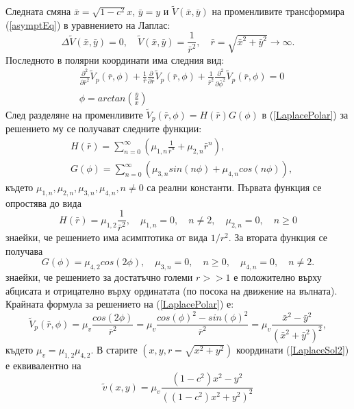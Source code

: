 \documentclass{article}
\newcommand{\be}{\begin{equation}}
\newcommand{\ee}{\end{equation}}
\newcommand{\rf}[1]{(\ref{#1})}
\begin{document}
\FloatBarrier
Следната смяна $\bar x  = \sqrt{1-c^2} x$, $\bar y = y$ и $\tilde V (\bar x, \bar y)$ на променливите трансформира \rf{asymptEq} в уравнението на Лаплас:
\be\label{LaplaceEq}
\Delta \tilde V(\bar x, \bar y) = 0, \quad \tilde V(\bar x, \bar y) = \frac{1}{\bar r^2}, \quad \bar r = \sqrt{\bar x^2 + \bar y^2} \rightarrow \infty.
\ee
Последното в полярни координати има следния вид:
\begin{align}\label{LaplacePolar}
&\frac{\partial^2}{\partial \bar r^2} \tilde V_p(\bar r, \phi) + \frac{1}{\bar r} \frac{\partial}{\partial \bar r} \tilde V_p(\bar r, \phi) + \frac{1}{\bar r^2} \frac{\partial^2}{\partial \bar \phi^2} \tilde V_p(\bar r, \phi) = 0 \\
&\phi = arctan(\frac{\bar y}{\bar x}) \nonumber
\end{align}
След разделяне на променливите $\tilde V_p(\bar r, \phi) = H(\bar r) G(\phi)$ в \rf{LaplacePolar} за решението му се получават следните функции:
\begin{align}\label{LaplaceSol}
&H(\bar{r}) = \sum^{\infty}_{n=0} (\mu_{1,n} \frac{1}{ \bar{r}^n} + \mu_{2,n} \bar{r}^n ),
\\ \nonumber &G(\phi) = \sum^{\infty}_{n=0} (\mu_{3,n}sin(n \phi ) + \mu_{4,n}cos(n \phi)),
\end{align}
където $\mu_{1,n}, \mu_{2,n}, \mu_{3,n}, \mu_{4,n}, n \neq 0$ са реални константи. Първата функция се опростява до вида
\be
H(\bar r) = \mu_{1,2}\frac{1}{\bar r^2}, \quad \mu_{1,n} = 0, \quad n \neq 2, \quad \mu_{2,n} = 0, \quad n \ge 0
\ee
знаейки, че решението има асимптотика от вида $1/r^2$. За втората функция се получава
\be
G(\phi) = \mu_{4,2}cos(2 \phi), \quad \mu_{3,n} = 0, \quad n \ge 0, \quad \mu_{4,n} = 0, \quad n \neq 2.
\ee
знаейки, че решението за достатъчно големи $r >> 1$ е положително върху абцисата и отрицателно върху ординатата (по посока на движение на вълната). Крайната формула за решението на \rf{LaplacePolar} е:
\be \label{LaplaceSol2}
\tilde V_p(\bar r, \phi) = \mu_v \frac{ cos(2 \phi) }{ \bar r^2 } = \mu_v \frac{ cos(\phi)^2 - sin(\phi)^2 }{ \bar r^2 } = \mu_v \frac{ \bar x^2 - \bar y^2 }{ (\bar x^2 + \bar y^2)^2 },
\ee
където $\mu_v = \mu_{1,2} \mu_{4,2}$. В старите $(x, y, r=\sqrt{x^2+y^2})$ координати \rf{LaplaceSol2} е еквивалентно на 
\be\label{bndv}
\tilde v(x, y) = \mu_v \frac{ (1-c^2) x^2 - y^2 }{ ((1-c^2) x^2 + y^2)^2 }
\ee
\end{document}
